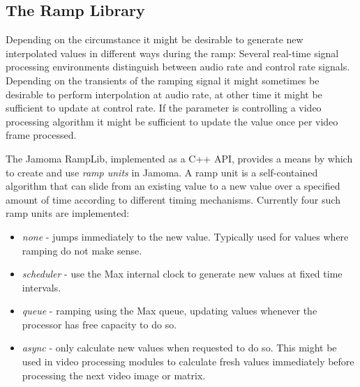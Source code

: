 \documentclass{article}
\begin{document}
\subsection{The Ramp Library} %
\label{ssec:ramplib}


Depending on the circumstance it might be desirable to generate new interpolated values in different ways during the ramp: Several real-time signal processing environments distinguish between audio rate and control rate signals. Depending on the transients of the ramping signal it might sometimes be desirable to perform interpolation at audio rate, at other time it might be sufficient to update at  control rate. If the parameter is controlling a video processing algorithm it might be sufficient to update the value once per video frame processed.




The Jamoma RampLib, implemented as a C++ API, provides a means by which to create and use \emph{ramp units} in Jamoma.  A ramp unit is a self-contained algorithm that can slide from an existing value to a new value over a specified amount of time according to different timing mechanisms. Currently four such ramp units are implemented:

\begin{itemize}
	\item \emph{none} - jumps immediately to the new value. Typically used for values where ramping do not make sense.
	\item \emph{scheduler} - use the Max internal clock to generate new values at fixed time intervals.
	\item \emph{queue} - ramping using the Max queue, updating values whenever the processor has free capacity to do so.
	\item \emph{async} - only calculate new values when requested to do so. This might be used in video processing modules to calculate fresh values immediately before processing the next video image or matrix.
\end{itemize}
\end{document}
